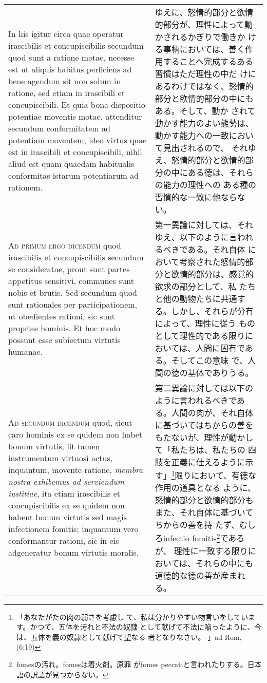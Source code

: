 \documentclass[10pt]{jsarticle}
\begin{document}
\begin{longtable}{p{21em}p{21em}}
\\


In his igitur circa quae operatur irascibilis et concupiscibilis
secundum quod sunt a ratione motae, necesse est ut aliquis habitus
perficiens ad bene agendum sit non solum in ratione, sed etiam in
irascibili et concupiscibili. Et quia bona dispositio potentiae
moventis motae, attenditur secundum conformitatem ad potentiam
moventem; ideo virtus quae est in irascibili et concupiscibili, nihil
aliud est quam quaedam habitualis conformitas istarum potentiarum ad
rationem.

&

ゆえに、怒情的部分と欲情的部分が、理性によって動かされるかぎりで働きか
ける事柄においては、善く作用することへ完成するある習慣はただ理性の中だ
けにあるわけではなく、怒情的部分と欲情的部分の中にもある。そして、動か
されて動かす能力のよい態勢は、動かす能力への一致において見出されるので、
それゆえ、怒情的部分と欲情的部分の中にある徳は、それらの能力の理性への
ある種の習慣的な一致に他ならない。

\\



{\scshape Ad primum ergo dicendum} quod irascibilis et concupiscibilis
secundum se consideratae, prout sunt partes appetitus sensitivi,
communes sunt nobis et brutis. Sed secundum quod sunt rationales per
participationem, ut obedientes rationi, sic sunt propriae hominis. Et
hoc modo possunt esse subiectum virtutis humanae.

&

第一異論に対しては、それゆえ、以下のように言われるべきである。それ自体
において考察された怒情的部分と欲情的部分は、感覚的欲求の部分として、私
たちと他の動物たちに共通する。しかし、それらが分有によって、理性に従う
ものとして理性的である限りにおいては、人間に固有である。そしてこの意味
で、人間の徳の基体でありうる。

\\



{\scshape Ad secundum dicendum} quod, sicut caro hominis ex se quidem
non habet bonum virtutis, fit tamen instrumentum virtuosi actus,
inquantum, movente ratione, {\itshape membra nostra exhibemus ad
serviendum iustitiae}, ita etiam irascibilis et concupiscibilis ex se
quidem non habent bonum virtutis sed magis infectionem fomitis;
inquantum vero conformantur rationi, sic in eis adgeneratur bonum
virtutis moralis.

&

第二異論に対しては以下のように言われるべきである。人間の肉が、それ自体
に基づいてはちからの善をもたないが、理性が動かして「私たちは、私たちの
四肢を正義に仕えるように示す」\footnote{「あなたがたの肉の弱さを考慮し
て、私は分かりやすい物言いをしています。かつて、五体を汚れと不法の奴隷
として献げて不法に陥ったように、今は、五体を義の奴隷として献げて聖なる
者となりなさい。 」ad Rom, (6:19)}限りにおいて、有徳な作用の道具となる
ように、怒情的部分と欲情的部分もまた、それ自体に基づいてちからの善を持
たず、むしろinfectio fomitis\footnote{fomesの汚れ。fomesは着火剤。原罪
がfomes peccatiと言われたりする。日本語の訳語が見つからない。}であるが、
理性に一致する限りにおいては、それらの中にも道徳的な徳の善が産まれる。


\end{longtable}
\end{document}
